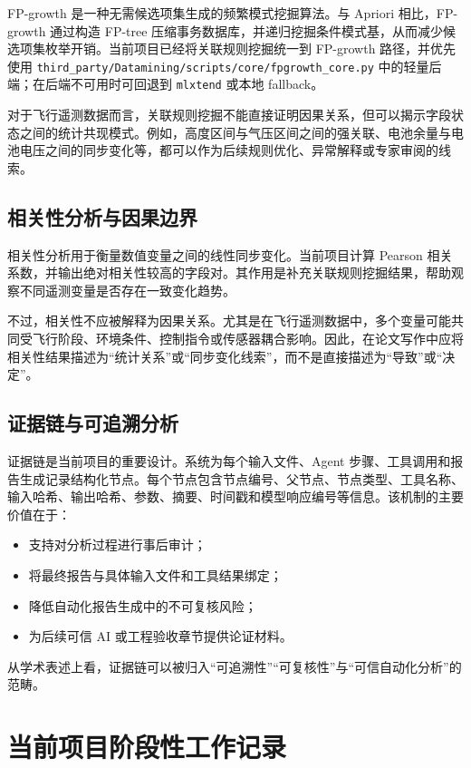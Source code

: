 \documentclass[UTF8,a4paper,zihao=-4]{ctexart}
\begin{document}
FP-growth 是一种无需候选项集生成的频繁模式挖掘算法。与 Apriori 相比，FP-growth 通过构造 FP-tree 压缩事务数据库，并递归挖掘条件模式基，从而减少候选项集枚举开销。当前项目已经将关联规则挖掘统一到 FP-growth 路径，并优先使用 \texttt{third\_party/Datamining/scripts/core/fpgrowth\_core.py} 中的轻量后端；在后端不可用时可回退到 \texttt{mlxtend} 或本地 fallback。

对于飞行遥测数据而言，关联规则挖掘不能直接证明因果关系，但可以揭示字段状态之间的统计共现模式。例如，高度区间与气压区间之间的强关联、电池余量与电池电压之间的同步变化等，都可以作为后续规则优化、异常解释或专家审阅的线索。

\subsection{相关性分析与因果边界}

相关性分析用于衡量数值变量之间的线性同步变化。当前项目计算 Pearson 相关系数，并输出绝对相关性较高的字段对。其作用是补充关联规则挖掘结果，帮助观察不同遥测变量是否存在一致变化趋势。

不过，相关性不应被解释为因果关系。尤其是在飞行遥测数据中，多个变量可能共同受飞行阶段、环境条件、控制指令或传感器耦合影响。因此，在论文写作中应将相关性结果描述为“统计关系”或“同步变化线索”，而不是直接描述为“导致”或“决定”。

\subsection{证据链与可追溯分析}

证据链是当前项目的重要设计。系统为每个输入文件、Agent 步骤、工具调用和报告生成记录结构化节点。每个节点包含节点编号、父节点、节点类型、工具名称、输入哈希、输出哈希、参数、摘要、时间戳和模型响应编号等信息。该机制的主要价值在于：
\begin{itemize}
  \item 支持对分析过程进行事后审计；
  \item 将最终报告与具体输入文件和工具结果绑定；
  \item 降低自动化报告生成中的不可复核风险；
  \item 为后续可信 AI 或工程验收章节提供论证材料。
\end{itemize}

从学术表述上看，证据链可以被归入“可追溯性”“可复核性”与“可信自动化分析”的范畴。

\section{当前项目阶段性工作记录}
\end{document}
